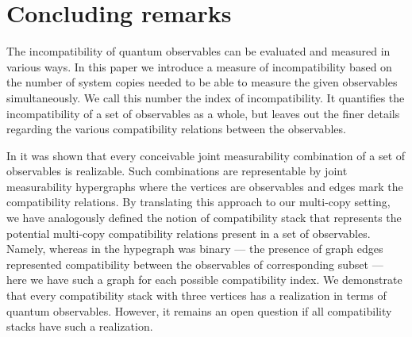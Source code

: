 \documentclass[12pt]{amsart}
\theoremstyle{definition}
\begin{document}
\section{Concluding remarks}\label{sec:conclusion}


The incompatibility of quantum observables can be evaluated and measured in various ways. In this paper we introduce a measure of incompatibility based on the number of system copies needed to be able to measure the given observables simultaneously. We call this number the index of  incompatibility.  It quantifies the incompatibility of a set of observables as a whole, but leaves out the finer details regarding the various compatibility relations between the observables.

In \cite{KuHeFr14} it was shown that every conceivable joint measurability combination of a set of observables is realizable. Such combinations are representable by joint measurability hypergraphs where the vertices are observables and edges mark the compatibility relations. %
By translating this approach to our multi-copy setting, we have  analogously defined the notion of compatibility stack that represents the potential multi-copy compatibility relations present in a set of observables. Namely, whereas in \cite{KuHeFr14} the hypegraph was binary --- the presence of graph edges represented compatibility between the observables of corresponding subset --- here we have such a graph for each possible compatibility index. 
We demonstrate that every compatibility stack with three vertices has a realization in terms of quantum observables. However, it remains an open question if all compatibility stacks have such a realization.


\vspace{6pt} 

\end{document}

